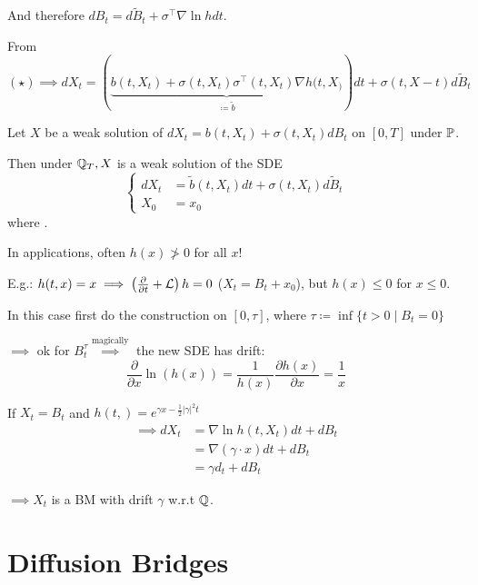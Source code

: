 And therefore $dB_t = d\tilde{B}_t+\sigma^\intercal \nabla \ln h dt$.

From $(\star)\implies dX_t = (\underbrace{b(t,X_t)+\sigma(t,X_t)\sigma^\intercal(t,X_t)\nabla h(t,X_)}_{\coloneqq \tilde{b}})dt + \sigma(t,X-t)d\tilde{B}_t$

\begin{proposition}\label{prop:2.3}
    Let $X$ be a weak solution of $dX_t=b(t,X_t)+\sigma(t,X_t)dB_t$ on $[0,T]$ under $\mathbb{P}$.

    Then under $\mathbb{Q}_T, X$ is a weak solution of the SDE 
    \[\begin{cases}
        dX_t &= \tilde{b}(t,X_t)dt+\sigma(t,X_t)d\tilde{B}_t\\
        X_0&=x_0
    \end{cases}\]
    where .
\end{proposition}

\begin{remark}
    In applications, often $h(x)\not> 0$ for all $x$!

    E.g.: $h(t,x)=x\implies \left(\frac{\partial}{\partial t}+\mathcal{L} \right)h=0$ ($X_t=B_t+x_0$), but $h(x)\leq 0$ for $x\leq 0$.

    In this case first do the construction on $[0,\tau]$, where $\tau\coloneqq\inf\{t>0\mid B_t=0\}$

    $\implies$ ok for $B_t^\tau\stackrel{\text{magically}}{\implies}$ the new SDE has drift:
    \[\frac{\partial}{\partial x}\ln(h(x))=\frac{1}{h(x)}\frac{\partial h(x)}{\partial x}=\frac{1}{x}\] 
\end{remark}

\begin{aexample} %
    If $X_t=B_t$ and $h(t,)=e^{\gamma x-\frac{1}{2}\vert \gamma\vert^2 t}$
    \begin{align*}
        \implies dX_t &= \nabla \ln h(t,X_t)dt + dB_t\\
        &=\nabla(\gamma \cdot x)dt + dB_t \\
        &=\gamma d_t + d B_t
    \end{align*}

    $\implies X_t$ is a BM with drift $\gamma$ w.r.t $\mathbb{Q}$.
\end{aexample}

\section{Diffusion Bridges}

